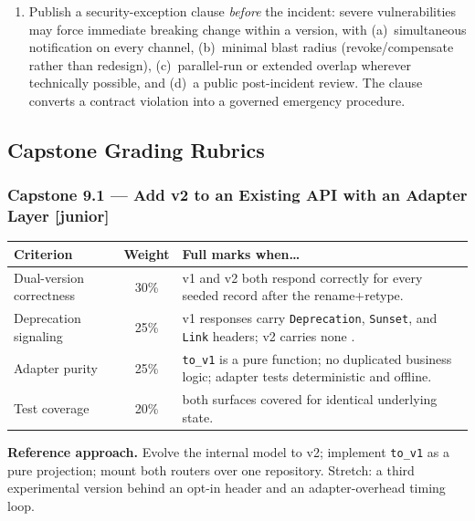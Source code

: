 \begin{enumerate}[label=\textbf{E9.\arabic*.}, leftmargin=2.8em]
    (you ship the clients), generated models tolerate exact content types,
    and URIs stay stable. The six-month release tail dictates the timeline:
    support N-2 versions for at least 6--9 months, instrument per-version
    traffic, and use a minimum-version killswitch only with a consumer
    notification runway.
  \item Publish a security-exception clause \emph{before} the incident:
    severe vulnerabilities may force immediate breaking change within a
    version, with (a)~simultaneous notification on every channel,
    (b)~minimal blast radius (revoke/compensate rather than redesign),
    (c)~parallel-run or extended overlap wherever technically possible, and
    (d)~a public post-incident review. The clause converts a contract
    violation into a governed emergency procedure.
\end{enumerate}

\subsection{Capstone Grading Rubrics}

\subsubsection*{Capstone 9.1 --- Add v2 to an Existing API with an Adapter Layer [junior]}
\begin{center}\small
\begin{tabularx}{\textwidth}{l c X}
\toprule
\textbf{Criterion} & \textbf{Weight} & \textbf{Full marks when\ldots} \\
\midrule
Dual-version correctness & 30\% & v1 and v2 both respond correctly for every seeded record after the rename+retype. \\
Deprecation signaling & 25\% & v1 responses carry \texttt{Deprecation}, \texttt{Sunset}, and \texttt{Link} headers; v2 carries none \cite{rfc8594}. \\
Adapter purity & 25\% & \texttt{to\_v1} is a pure function; no duplicated business logic; adapter tests deterministic and offline. \\
Test coverage & 20\% & both surfaces covered for identical underlying state. \\
\bottomrule
\end{tabularx}
\end{center}
\textbf{Reference approach.} Evolve the internal model to v2; implement
\texttt{to\_v1} as a pure projection; mount both routers over one
repository. Stretch: a third experimental version behind an opt-in header
and an adapter-overhead timing loop.

